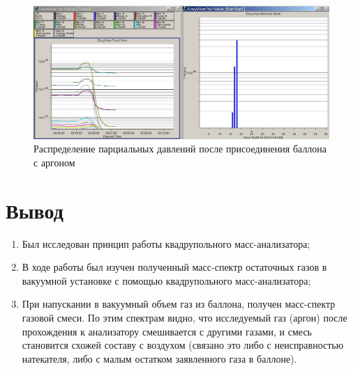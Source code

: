 \documentclass[a4paper]{article}
\begin{document}
\begin{enumerate}
\vspace{20cm}
\vspace{10cm}

\begin{figure}[h]
\begin{center}
\includegraphics[width=16cm]{gas_3.jpg}
\caption{Распределение парциальных давлений после присоединения баллона с аргоном}
\label{ris:experimoriginal} %

\end{center}
\end{figure}


\end{enumerate}

\section{Вывод}
\begin{enumerate}
    \item Был исследован принцип работы квадрупольного масс-анализатора;
    \item В ходе работы был изучен полученный масс-спектр остаточных газов в вакуумной установке с помощью квадрупольного масс-анализатора;
    \item При напускании в вакуумный объем газ из баллона, получен масс-спектр газовой смеси. По этим спектрам видно, что исследуемый газ (аргон) после прохождения к анализатору смешивается с другими газами, и смесь становится схожей составу с воздухом (связано это либо с неисправностью натекателя, либо с малым остатком заявленного газа в баллоне).
\end{enumerate}
\end{document}

